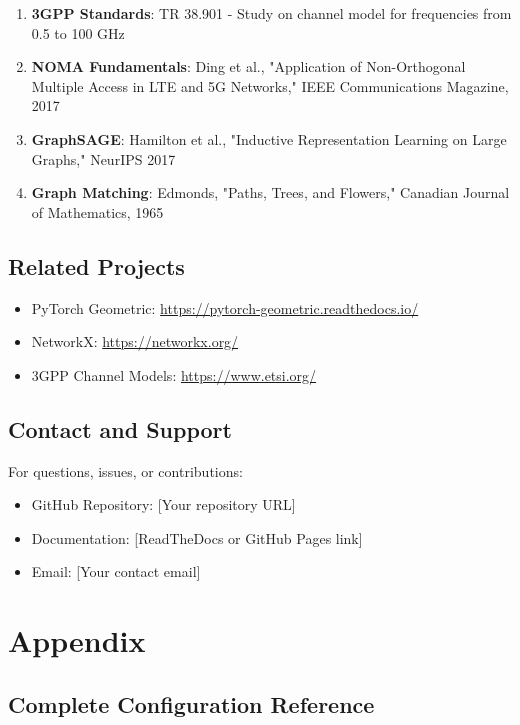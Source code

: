 \documentclass[12pt,a4paper]{article}
\begin{document}
\begin{enumerate}
    \item \textbf{3GPP Standards}: TR 38.901 - Study on channel model for frequencies from 0.5 to 100 GHz
    \item \textbf{NOMA Fundamentals}: Ding et al., "Application of Non-Orthogonal Multiple Access in LTE and 5G Networks," IEEE Communications Magazine, 2017
    \item \textbf{GraphSAGE}: Hamilton et al., "Inductive Representation Learning on Large Graphs," NeurIPS 2017
    \item \textbf{Graph Matching}: Edmonds, "Paths, Trees, and Flowers," Canadian Journal of Mathematics, 1965
\end{enumerate}

\subsection{Related Projects}

\begin{itemize}
    \item PyTorch Geometric: \url{https://pytorch-geometric.readthedocs.io/}
    \item NetworkX: \url{https://networkx.org/}
    \item 3GPP Channel Models: \url{https://www.etsi.org/}
\end{itemize}

\subsection{Contact and Support}

For questions, issues, or contributions:
\begin{itemize}
    \item GitHub Repository: [Your repository URL]
    \item Documentation: [ReadTheDocs or GitHub Pages link]
    \item Email: [Your contact email]
\end{itemize}

\section{Appendix}

\subsection{Complete Configuration Reference}
\end{document}

